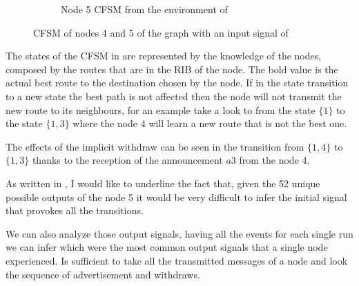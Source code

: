 \begin{figure}[h]
\begin{subfigure}[b]{0.45\textwidth}
		 \caption{Node \num{5} \ac{CFSM} from the environment of }
         \label{fig:fsm_node5}
     \end{subfigure}
		\caption{\ac{CFSM} of nodes \num{4} and \num{5} of the graph  with an input signal of }
        \label{fig:fsm_griffin_fig4}
\end{figure}

The states of the \ac{CFSM} in  are represented by the
knowledge of the nodes, composed by the routes that are in the \ac{RIB} of the node.
The bold value is the actual best route to the destination chosen by the node.
If in the state transition to a new state the best path is not affected then the
node will not transmit the new route to its neighbours, for an example take
a look to  from the state $\{1\}$ to the state $\{1, 3\}$
where the node \num{4} will learn a new route that is not the best one.

The effects of the implicit withdraw can be seen in 
the transition from $\{1, 4\}$ to $\{1, 3\}$ thanks to the reception of the
announcement $a3$ from the node \num{4}.

As written in \cite{griffinFSM}, I would like to underline the fact that, given
the \num{52} unique possible outputs of the node \num{5} it would be very difficult
to infer the initial signal that provokes all the transitions.

We can also analyze those output signals, having all the events for each single
run we can infer which were the most common output signals that a single node
experienced.
Is sufficient to take all the transmitted messages of a node and look the sequence
of advertisement and withdraws.

